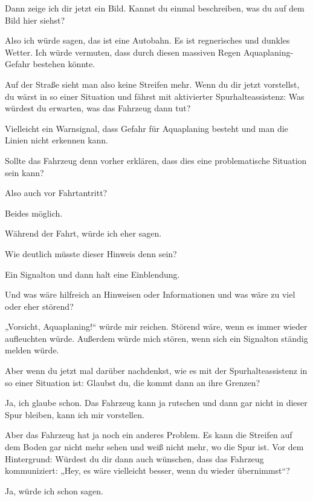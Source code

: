 \interviewerin
Dann zeige ich dir jetzt ein Bild. Kannst du einmal beschreiben, was du
auf dem Bild hier siehst?

Also ich würde sagen, das ist eine Autobahn. Es ist regnerisches und
dunkles Wetter. Ich würde vermuten, dass durch diesen massiven Regen
Aquaplaning-Gefahr bestehen könnte.

\interviewerin
Auf der Straße sieht man also keine Streifen mehr. Wenn du dir jetzt
vorstellst, du wärst in so einer Situation und fährst mit aktivierter
Spurhalteassistenz: Was würdest du erwarten, was das Fahrzeug dann tut?

Vielleicht ein Warnsignal, dass Gefahr für Aquaplaning besteht und man
die Linien nicht erkennen kann.

\interviewerin
Sollte das Fahrzeug denn vorher erklären, dass dies eine problematische
Situation sein kann?

Also auch vor Fahrtantritt?

\interviewerin
Beides möglich.

Während der Fahrt, würde ich eher sagen.

\interviewerin
Wie deutlich müsste dieser Hinweis denn sein?

Ein Signalton und dann halt eine Einblendung.

\interviewerin
Und was wäre hilfreich an Hinweisen oder Informationen und was wäre zu
viel oder eher störend?

„Vorsicht, Aquaplaning!“ würde mir reichen. Störend wäre, wenn es immer
wieder aufleuchten würde. Außerdem würde mich stören, wenn sich ein
Signalton ständig melden würde.

\interviewerin
Aber wenn du jetzt mal darüber nachdenkst, wie es mit der
Spurhalteassistenz in so einer Situation ist: Glaubst du, die kommt
dann an ihre Grenzen?

Ja, ich glaube schon. Das Fahrzeug kann ja rutschen und dann gar nicht
in dieser Spur bleiben, kann ich mir vorstellen.

\interviewerin
Aber das Fahrzeug hat ja noch ein anderes Problem. Es kann die Streifen
auf dem Boden gar nicht mehr sehen und weiß nicht mehr, wo die Spur ist.
Vor dem Hintergrund: Würdest du dir dann auch wünschen, dass das
Fahrzeug kommuniziert: „Hey, es wäre vielleicht besser, wenn du wieder
übernimmst“?

Ja, würde ich schon sagen.

